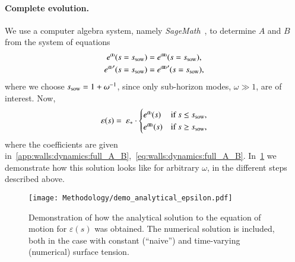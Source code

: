     \paragraph{Complete evolution.} %
    We use a computer algebra system, namely \textit{SageMath}~\citep{sagemath}, to determine $A$ and $B$ from the system of equations
    \begin{equation}
        \begin{split}
            e^{\text{{\tiny{\textbf{(I)}}}}}(s=s_\mathrm{sow}) &= e^{\text{{\tiny{\textbf{(II)}}}}}(s=s_\mathrm{sow}), \\
            {e^{\text{{\tiny{\textbf{(I)}}}}}}'(s=s_\mathrm{sow}) &= {e^{\text{{\tiny{\textbf{(II)}}}}}}'(s=s_\mathrm{sow}),
        \end{split}
    \end{equation}
    where we choose $s_\mathrm{sow}=1+\omega^{-1}$, since only sub-horizon modes, $\omega\gg 1$, are of interest. Now,
    \begin{equation}\label{eq:pertwalls:mywalls:eps_s_complete_MD}
        \varepsilon(s) =  \epsast \cdot \begin{cases}
            e^{\text{\eqregimenum{I}}} (s)  &\text{if } s \leq s\ped{sow}, \\
            e^{\text{\eqregimenum{II}}}(s)  &\text{if }  s \geq s\ped{sow},
        \end{cases}
    \end{equation}
    where the coefficients are given in~\cref{app:walls:dynamics:full_A_B},~\cref{eq:walls:dynamics:full_A_B}. %
    In~\cref{fig:pertwalls:mywalls:demo_analytical_epsilon} we demonstrate how this solution looks like for arbitrary $\omega$, in the different steps described above. %
    \begin{figure}[h]
        \centering
        \texttt{[image: Methodology/demo\_analytical\_epsilon.pdf]}
        \caption{Demonstration of how the analytical solution to the equation of motion for $\varepsilon(s)$ was obtained. The numerical solution is included, both in the case with constant (``naive'') and time-varying (numerical) surface tension.}  
        \label{fig:pertwalls:mywalls:demo_analytical_epsilon}
    \end{figure}

